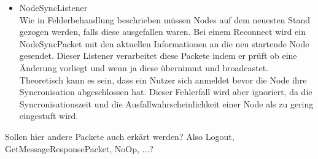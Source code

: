 \documentclass[a4paper]{article}
\theoremstyle{definition}
\begin{document}
\begin{itemize}
        \item NodeSyncListener\\
            Wie in Fehlerbehandlung beschrieben müssen Nodes auf dem neuesten Stand gezogen werden, falls diese ausgefallen waren. Bei einem Reconnect wird ein NodeSyncPacket mit den aktuellen Informationen an die neu startende Node gesendet. Dieser Listener verarbeitet diese Packete indem er prüft ob eine Änderung vorliegt und wenn ja diese übernimmt und broadcastet. Theoretisch kann es sein, dass ein Nutzer sich anmeldet bevor die Node ihre Syncronisation abgeschlossen hat. Dieser Fehlerfall wird aber ignoriert, da die Syncronisationszeit und die Ausfallwahrscheinlichkeit einer Node als zu gering eingestuft wird.
    \end{itemize}


    Sollen hier andere Packete auch erkärt werden? Also Logout, GetMessageResponsePacket, NoOp, ...?
    
\end{document}
